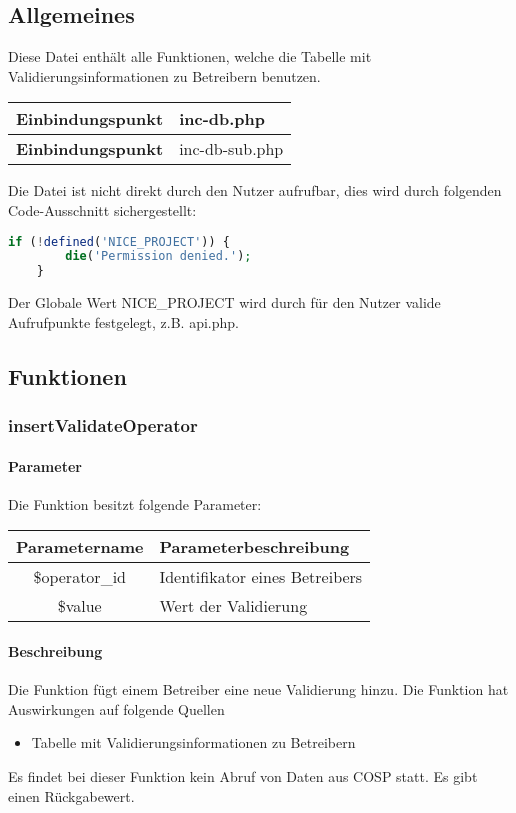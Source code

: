 \subsection{Allgemeines} Diese Datei enthält alle Funktionen, welche die Tabelle mit Validierungsinformationen zu Betreibern benutzen.
\begin{table}[H]
	\begin{tabular}{|c|p{11cm}|}
		\hline
		\textbf{Einbindungspunkt} & inc-db.php \\ \hline
		\textbf{Einbindungspunkt} & inc-db-sub.php \\ \hline
	\end{tabular}
\end{table}
Die Datei ist nicht direkt durch den Nutzer aufrufbar, dies wird durch folgenden Code-Ausschnitt sichergestellt:
\begin{lstlisting}[language=php]
	if (!defined('NICE_PROJECT')) {
		die('Permission denied.');
	}
\end{lstlisting}
Der Globale Wert {\glqq NICE\_PROJECT\grqq} wird durch für den Nutzer valide Aufrufpunkte festgelegt, z.B. {\glqq api.php\grqq}.
\newpage
\subsection{Funktionen}
\subsubsection{insertValidateOperator}
\paragraph{Parameter} Die Funktion besitzt folgende Parameter:
\begin{table}[H]
	\begin{tabular}{|c|p{11cm}|}
		\hline
		\textbf{Parametername} & \textbf{Parameterbeschreibung} \\ \hline
		\$operator\_id & Identifikator eines Betreibers \\ \hline
		\$value        & Wert der Validierung \\ \hline
	\end{tabular}
\end{table}
\paragraph{Beschreibung} Die Funktion fügt einem Betreiber eine neue Validierung hinzu. Die Funktion hat Auswirkungen auf folgende Quellen
\begin{itemize}
	\item Tabelle mit Validierungsinformationen zu Betreibern
\end{itemize}
Es findet bei dieser Funktion kein Abruf von Daten aus {\glqq COSP\grqq} statt. Es gibt einen Rückgabewert.
